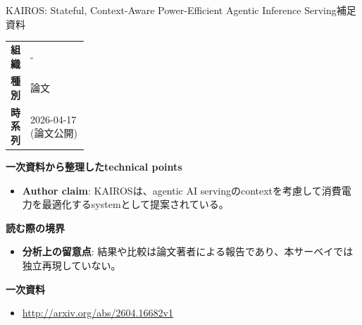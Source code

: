 \begin{technicalnote}{KAIROS: Stateful, Context-Aware Power-Efficient Agentic Inference Serving}{補足資料}
\begingroup
\begin{tabularx}{\linewidth}{@{}>{\bfseries}p{0.22\linewidth}X@{}}
組織 & - \\
種別 & 論文 \\
時系列 & 2026-04-17 (論文公開) \\
\end{tabularx}
\smallskip
{\bfseries 一次資料から整理したtechnical points}
\begin{itemize}[leftmargin=1.5em,itemsep=0.35em]
\item \textbf{Author claim}: KAIROSは、agentic AI servingのcontextを考慮して消費電力を最適化するsystemとして提案されている。
\end{itemize}
{\bfseries 読む際の境界}
\begin{itemize}[leftmargin=1.5em,itemsep=0.35em]
\item \textbf{分析上の留意点}: 結果や比較は論文著者による報告であり、本サーベイでは独立再現していない。
\end{itemize}
\begin{samepage}
{\bfseries 一次資料}
\begingroup\sloppy
\begin{itemize}[leftmargin=1.5em,itemsep=0.25em]
\item {\scriptsize\url{http://arxiv.org/abs/2604.16682v1}}
\end{itemize}
\endgroup
\end{samepage}
\endgroup
\end{technicalnote}
\medskip

